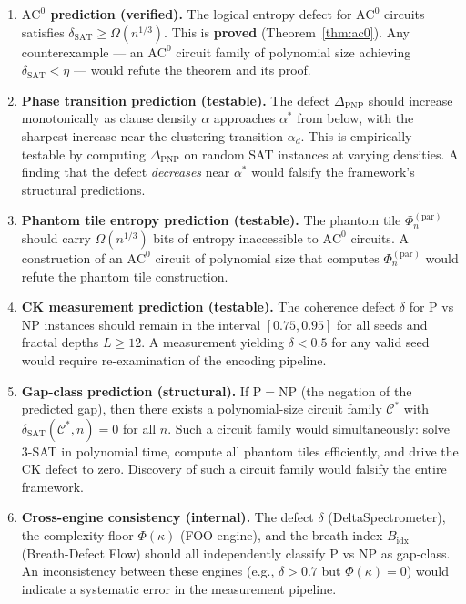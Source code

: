 \documentclass[11pt]{article}
\theoremstyle{definition}
\theoremstyle{remark}
\newcommand{\calC}{\mathcal{C}}
\newcommand{\ACz}{\mathrm{AC}^0}
\newcommand{\dSAT}{\delta_{\mathrm{SAT}}}
\begin{document}
\begin{enumerate}[label=(F\arabic*),nosep]
  \item \textbf{$\ACz$ prediction (verified).}  The logical entropy defect
    for $\ACz$ circuits satisfies $\dSAT \geq \Omega(n^{1/3})$.  This is
    \textbf{proved} (Theorem~\ref{thm:ac0}).  Any counterexample ---
    an $\ACz$ circuit family of polynomial size achieving $\dSAT < \eta$
    --- would refute the theorem and its proof.

  \item \textbf{Phase transition prediction (testable).}  The defect
    $\Delta_{\mathrm{PNP}}$ should increase monotonically as clause
    density $\alpha$ approaches $\alpha^*$ from below, with the sharpest
    increase near the clustering transition $\alpha_d$.  This is
    empirically testable by computing $\Delta_{\mathrm{PNP}}$ on random
    SAT instances at varying densities.  A finding that the defect
    \emph{decreases} near $\alpha^*$ would falsify the framework's
    structural predictions.

  \item \textbf{Phantom tile entropy prediction (testable).}  The phantom
    tile $\Phi_n^{(\mathrm{par})}$ should carry $\Omega(n^{1/3})$ bits
    of entropy inaccessible to $\ACz$ circuits.  A construction of an
    $\ACz$ circuit of polynomial size that computes $\Phi_n^{(\mathrm{par})}$
    would refute the phantom tile construction.

  \item \textbf{CK measurement prediction (testable).}  The coherence
    defect $\delta$ for P vs NP instances should remain in the interval
    $[0.75, 0.95]$ for all seeds and fractal depths $L \geq 12$.  A
    measurement yielding $\delta < 0.5$ for any valid seed would require
    re-examination of the encoding pipeline.

  \item \textbf{Gap-class prediction (structural).}  If $\mathrm{P} =
    \mathrm{NP}$ (the negation of the predicted gap), then there exists
    a polynomial-size circuit family $\calC^*$ with $\dSAT(\calC^*, n) = 0$
    for all $n$.  Such a circuit family would simultaneously: solve 3-SAT
    in polynomial time, compute all phantom tiles efficiently, and drive
    the CK defect to zero.  Discovery of such a circuit family would
    falsify the entire framework.

  \item \textbf{Cross-engine consistency (internal).}  The defect
    $\delta$ (DeltaSpectrometer), the complexity floor $\Phi(\kappa)$
    (FOO engine), and the breath index $B_{\mathrm{idx}}$ (Breath-Defect
    Flow) should all independently classify P vs NP as gap-class.  An
    inconsistency between these engines (e.g., $\delta > 0.7$ but
    $\Phi(\kappa) = 0$) would indicate a systematic error in the
    measurement pipeline.
\end{enumerate}
\end{document}
